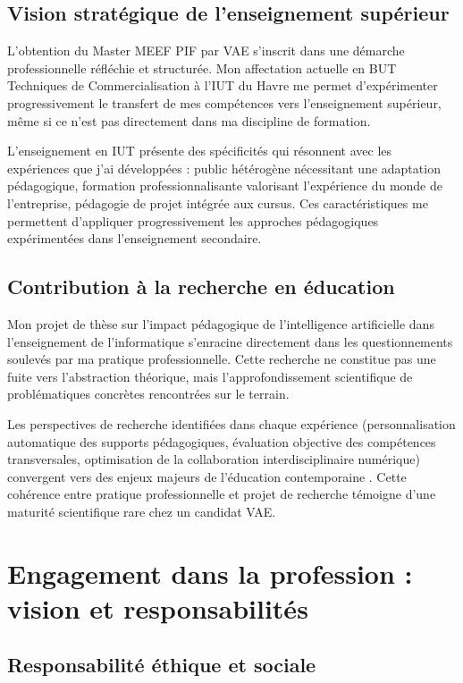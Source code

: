 \documentclass[12pt,a4paper]{report}
\begin{document}
\subsection*{Vision stratégique de l'enseignement supérieur}

L'obtention du Master MEEF PIF par VAE s'inscrit dans une démarche professionnelle réfléchie et structurée. Mon affectation actuelle en BUT Techniques de Commercialisation à l'IUT du Havre me permet d'expérimenter progressivement le transfert de mes compétences vers l'enseignement supérieur, même si ce n'est pas directement dans ma discipline de formation.

L'enseignement en IUT présente des spécificités qui résonnent avec les expériences que j'ai développées : public hétérogène nécessitant une adaptation pédagogique, formation professionnalisante valorisant l'expérience du monde de l'entreprise, pédagogie de projet intégrée aux cursus. Ces caractéristiques me permettent d'appliquer progressivement les approches pédagogiques expérimentées dans l'enseignement secondaire.

\subsection*{Contribution à la recherche en éducation}

Mon projet de thèse sur l'impact pédagogique de l'intelligence artificielle dans l'enseignement de l'informatique s'enracine directement dans les questionnements soulevés par ma pratique professionnelle. Cette recherche ne constitue pas une fuite vers l'abstraction théorique, mais l'approfondissement scientifique de problématiques concrètes rencontrées sur le terrain.

Les perspectives de recherche identifiées dans chaque expérience (personnalisation automatique des supports pédagogiques, évaluation objective des compétences transversales, optimisation de la collaboration interdisciplinaire numérique) convergent vers des enjeux majeurs de l'éducation contemporaine \parencite{intelligence_artificielle_education}. Cette cohérence entre pratique professionnelle et projet de recherche témoigne d'une maturité scientifique rare chez un candidat VAE.

\section*{Engagement dans la profession : vision et responsabilités}

\subsection*{Responsabilité éthique et sociale}
\end{document}
